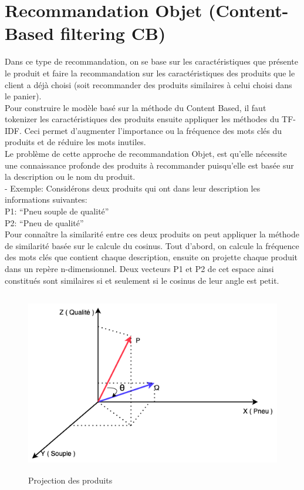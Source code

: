 \section{Recommandation Objet (Content-Based filtering CB)}
Dans ce type de recommandation, on se base sur les caractéristiques que présente le produit et faire la recommandation sur les caractéristiques des produits que le client a déjà choisi (soit recommander des produits similaires à celui choisi dans le panier). \\
Pour construire le modèle basé sur la méthode du Content Based, il faut tokenizer les caractéristiques des produits ensuite appliquer les méthodes du TF-IDF. Ceci permet d’augmenter l’importance ou la fréquence des mots clés du produits et de réduire les mots inutiles. \\
Le problème de cette approche de recommandation Objet, est qu'elle nécessite une connaissance profonde des produits à recommander puisqu'elle est basée sur la description ou le nom du produit.\\
- Exemple:
Considérons deux produits qui ont dans leur description les informations suivantes:\\
 	P1: “Pneu souple de qualité”\\
P2: “Pneu de qualité”\\
Pour connaître la similarité entre ces deux produits on peut appliquer la méthode de similarité basée sur le calcule du cosinus. Tout d’abord, on calcule la fréquence des mots clés que contient chaque description, ensuite on projette chaque produit dans un repère n-dimensionnel. Deux vecteurs P1 et P2 de cet espace ainsi constitués sont similaires si et seulement si  le cosinus de leur angle est petit.

\begin{figure}[h]
\begin{center}
\includegraphics[width=15cm,height=8cm]{images/cosin_similarity.png}
\caption[Projection des produits]{Projection des produits}
\label{monlabel}
\end{center}
\end{figure}

